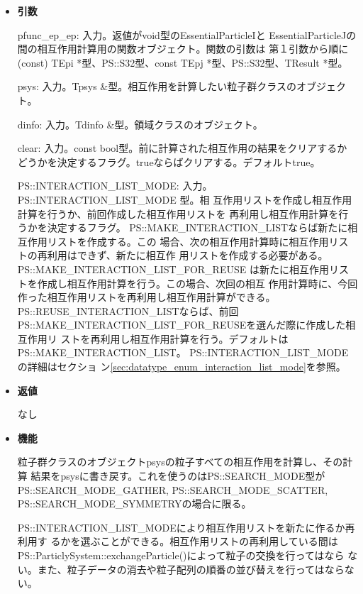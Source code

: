 \begin{itemize}

\item {\bf 引数}

pfunc\_ep\_ep: 入力。返値がvoid型のEssentialParticleIと
EssentialParticleJの間の相互作用計算用の関数オブジェクト。関数の引数は
第１引数から順に(const) TEpi *型、PS::S32型、const
TEpj *型、PS::S32型、TResult *型。

psys: 入力。Tpsys \&型。相互作用を計算したい粒子群クラスのオブジェクト。

dinfo: 入力。Tdinfo \&型。領域クラスのオブジェクト。

clear: 入力。const bool型。前に計算された相互作用の結果をクリアするか
どうかを決定するフラグ。trueならばクリアする。デフォルトtrue。

PS::INTERACTION\_LIST\_MODE: 入力。PS::INTERACTION\_LIST\_MODE 型。相
互作用リストを作成し相互作用計算を行うか、前回作成した相互作用リストを
再利用し相互作用計算を行うかを決定するフラグ。
PS::MAKE\_INTERACTION\_LISTならば新たに相互作用リストを作成する。この
場合、次の相互作用計算時に相互作用リストの再利用はできず、新たに相互作
用リストを作成する必要がある。PS::MAKE\_INTERACTION\_LIST\_FOR\_REUSE
は新たに相互作用リストを作成し相互作用計算を行う。この場合、次回の相互
作用計算時に、今回作った相互作用リストを再利用し相互作用計算ができる。
PS::REUSE\_INTERACTION\_LISTならば、前回
PS::MAKE\_INTERACTION\_LIST\_FOR\_REUSEを選んだ際に作成した相互作用リ
ストを再利用し相互作用計算を行う。デフォルトはPS::MAKE\_INTERACTION\_LIST。
PS::INTERACTION\_LIST\_MODEの詳細はセクショ
ン\ref{sec:datatype_enum_interaction_list_mode}を参照。

\item {\bf 返値}

なし

\item {\bf 機能}

粒子群クラスのオブジェクトpsysの粒子すべての相互作用を計算し、その計算
結果をpsysに書き戻す。これを使うのはPS::SEARCH\_MODE型が
PS::SEARCH\_MODE\_GATHER, PS::SEARCH\_MODE\_SCATTER,
PS::SEARCH\_MODE\_SYMMETRYの場合に限る。

PS::INTERACTION\_LIST\_MODEにより相互作用リストを新たに作るか再利用す
るかを選ぶことができる。相互作用リストの再利用している間は
PS::ParticlySystem::exchangeParticle()によって粒子の交換を行ってはなら
ない。また、粒子データの消去や粒子配列の順番の並び替えを行ってはならな
い。

\end{itemize}

